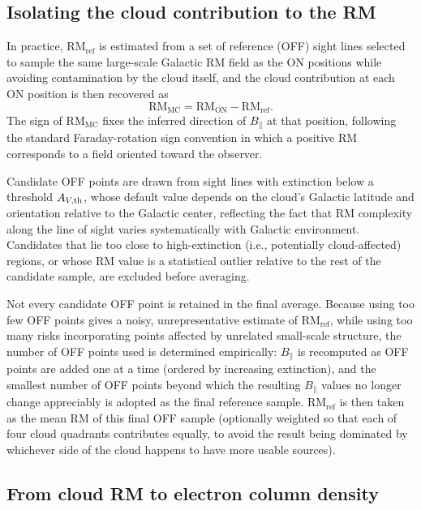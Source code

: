 \documentclass[twocolumn]{aastex631}
\begin{document}
\subsection{Isolating the cloud contribution to the RM}
\label{sec:method-rmref}

In practice, $\mathrm{RM_{ref}}$ is estimated from a set of reference (OFF) sight lines selected to sample the same large-scale Galactic RM field as the ON positions while avoiding contamination by the cloud itself, and the cloud contribution at each ON position is then recovered as
\begin{equation}
    \mathrm{RM_{MC}} = \mathrm{RM_{ON}} - \mathrm{RM_{ref}}.
\end{equation}
The sign of $\mathrm{RM_{MC}}$ fixes the inferred direction of $B_\parallel$ at that position, following the standard Faraday-rotation sign convention in which a positive RM corresponds to a field oriented toward the observer.

Candidate OFF points are drawn from sight lines with extinction below a threshold $A_{V,\rm th}$, whose default value depends on the cloud's Galactic latitude and orientation relative to the Galactic center, reflecting the fact that RM complexity along the line of sight varies systematically with Galactic environment. Candidates that lie too close to high-extinction (i.e., potentially cloud-affected) regions, or whose RM value is a statistical outlier relative to the rest of the candidate sample, are excluded before averaging.

Not every candidate OFF point is retained in the final average. Because using too few OFF points gives a noisy, unrepresentative estimate of $\mathrm{RM_{ref}}$, while using too many risks incorporating points affected by unrelated small-scale structure, the number of OFF points used is determined empirically: $B_\parallel$ is recomputed as OFF points are added one at a time (ordered by increasing extinction), and the smallest number of OFF points beyond which the resulting $B_\parallel$ values no longer change appreciably is adopted as the final reference sample. $\mathrm{RM_{ref}}$ is then taken as the mean RM of this final OFF sample (optionally weighted so that each of four cloud quadrants contributes equally, to avoid the result being dominated by whichever side of the cloud happens to have more usable sources).

\subsection{From cloud RM to electron column density}
\label{sec:method-ne}
\end{document}
